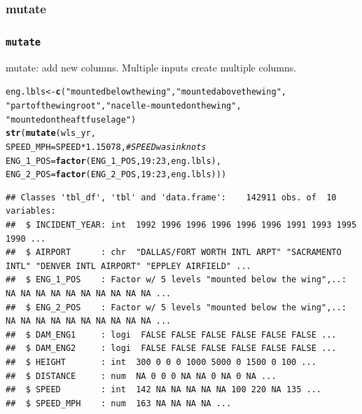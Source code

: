 \documentclass{beamer}\usepackage[]{graphicx}\usepackage[]{color}
\makeatletter
\newcommand{\hlnum}[1]{\textcolor[rgb]{0.686,0.059,0.569}{#1}}%
\newcommand{\hlstr}[1]{\textcolor[rgb]{0.192,0.494,0.8}{#1}}%
\newcommand{\hlcom}[1]{\textcolor[rgb]{0.678,0.584,0.686}{\textit{#1}}}%
\newcommand{\hlopt}[1]{\textcolor[rgb]{0,0,0}{#1}}%
\newcommand{\hlstd}[1]{\textcolor[rgb]{0.345,0.345,0.345}{#1}}%
\newcommand{\hlkwb}[1]{\textcolor[rgb]{0.69,0.353,0.396}{#1}}%
\newcommand{\hlkwc}[1]{\textcolor[rgb]{0.333,0.667,0.333}{#1}}%
\newcommand{\hlkwd}[1]{\textcolor[rgb]{0.737,0.353,0.396}{\textbf{#1}}}%
\newenvironment{kframe}{%
 \def\at@end@of@kframe{}%
 \ifinner\ifhmode%
  \def\at@end@of@kframe{\end{minipage}}%
  \begin{minipage}{\columnwidth}%
 \fi\fi%
 \def\FrameCommand##1{\hskip\@totalleftmargin \hskip-\fboxsep
 \colorbox{shadecolor}{##1}\hskip-\fboxsep
     \hskip-\linewidth \hskip-\@totalleftmargin \hskip\columnwidth}%
 \MakeFramed {\advance\hsize-\width
   \@totalleftmargin\z@ \linewidth\hsize
   \@setminipage}}%
 {\par\unskip\endMakeFramed%
 \at@end@of@kframe}
\newenvironment{knitrout}{}{} %
\makeatother
\begin{document}
\subsubsection{mutate}%
\begin{frame}[fragile]
  \frametitle{{\tt mutate}}
mutate: add new columns. Multiple inputs create multiple columns.
\begin{knitrout}\footnotesize
{}\color{fgcolor}\begin{kframe}
\begin{alltt}
\hlstd{eng.lbls} \hlkwb{<-} \hlkwd{c}\hlstd{(}\hlstr{"mounted below the wing"}\hlstd{,} \hlstr{"mounted above the wing"}\hlstd{,}
              \hlstr{"part of the wing root"}\hlstd{,} \hlstr{"nacelle-mounted on the wing"}\hlstd{,}
              \hlstr{"mounted on the aft fuselage"}\hlstd{)}
\hlkwd{str}\hlstd{(}\hlkwd{mutate}\hlstd{(wls_yr,}
           \hlkwc{SPEED_MPH} \hlstd{= SPEED} \hlopt{*} \hlnum{1.15078}\hlstd{,} \hlcom{# SPEED was in knots}
           \hlkwc{ENG_1_POS} \hlstd{=} \hlkwd{factor}\hlstd{(ENG_1_POS,} \hlnum{19}\hlopt{:}\hlnum{23}\hlstd{, eng.lbls),}
           \hlkwc{ENG_2_POS} \hlstd{=} \hlkwd{factor}\hlstd{(ENG_2_POS,} \hlnum{19}\hlopt{:}\hlnum{23}\hlstd{, eng.lbls)))}
\end{alltt}
\begin{verbatim}
## Classes 'tbl_df', 'tbl' and 'data.frame':	142911 obs. of  10 variables:
##  $ INCIDENT_YEAR: int  1992 1996 1996 1996 1996 1996 1991 1993 1995 1990 ...
##  $ AIRPORT      : chr  "DALLAS/FORT WORTH INTL ARPT" "SACRAMENTO INTL" "DENVER INTL AIRPORT" "EPPLEY AIRFIELD" ...
##  $ ENG_1_POS    : Factor w/ 5 levels "mounted below the wing",..: NA NA NA NA NA NA NA NA NA NA ...
##  $ ENG_2_POS    : Factor w/ 5 levels "mounted below the wing",..: NA NA NA NA NA NA NA NA NA NA ...
##  $ DAM_ENG1     : logi  FALSE FALSE FALSE FALSE FALSE FALSE ...
##  $ DAM_ENG2     : logi  FALSE FALSE FALSE FALSE FALSE FALSE ...
##  $ HEIGHT       : int  300 0 0 0 1000 5000 0 1500 0 100 ...
##  $ DISTANCE     : num  NA 0 0 0 NA NA 0 NA 0 NA ...
##  $ SPEED        : int  142 NA NA NA NA NA 100 220 NA 135 ...
##  $ SPEED_MPH    : num  163 NA NA NA NA ...
\end{verbatim}
\end{kframe}
\end{knitrout}
\end{frame} 
\end{document}
